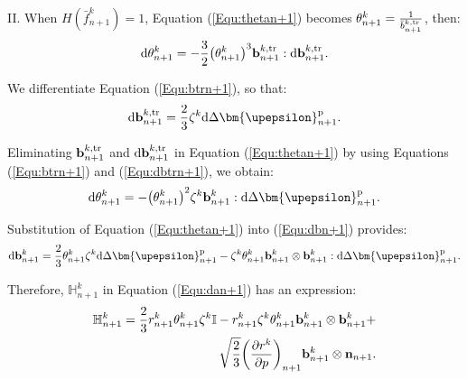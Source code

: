 II. When $H\left( {\bar f_{n + 1}^k} \right) = 1$, Equation (\ref{Equ:thetan+1}) becomes $\theta _{n + 1}^k = \frac{1}{{\bar b_{n + 1}^{k,{\rm{tr}}}}}$, then:
\begin{equation}
\label{Equ:thetan+1}
{\text{d}}\theta _{n + 1}^k =  - \frac{3}{2}{\left( {\theta _{n + 1}^k} \right)^3}{\bf{b}}_{n + 1}^{k,{\rm{tr}}}:{\text{d}}{\bf{b}}_{n + 1}^{k,{\rm{tr}}}.
\end{equation}

We differentiate Equation (\ref{Equ:btrn+1}), so that:
\begin{equation}
\label{Equ:dbtrn+1}
{\text{d}}{\bf{b}}_{n + 1}^{k,{\rm{tr}}} = \frac{2}{3}{\zeta ^k}{\text{d}}\Delta {\bm{\upepsilon }}_{n + 1}^{\rm{p}}.
\end{equation}

Eliminating ${\bf{b}}_{n + 1}^{k,{\rm{tr}}}$ and ${\text{d}}{\bf{b}}_{n + 1}^{k,{\rm{tr}}}$ in Equation (\ref{Equ:thetan+1}) by using Equations (\ref{Equ:btrn+1}) and (\ref{Equ:dbtrn+1}), we obtain:
\begin{equation}
\label{Equ:thetan+1}
{\text{d}}\theta _{n + 1}^k =  - {\left( {\theta _{n + 1}^k} \right)^2}{\zeta ^k}{\bf{b}}_{n + 1}^k:{\text{d}}\Delta {\bm{\upepsilon }}_{n + 1}^{\rm{p}}.
\end{equation}

Substitution of Equation (\ref{Equ:thetan+1}) into (\ref{Equ:dbn+1}) provides:
\begin{equation}
\label{Equ:dbn+12}
{\text{d}}{\bf{b}}_{n + 1}^k = \frac{2}{3}\theta _{n + 1}^k{\zeta ^k}{\text{d}}\Delta {\bm{\upepsilon }}_{n + 1}^{\rm{p}} - {\zeta ^k}\theta _{n + 1}^k{\bf{b}}_{n + 1}^k \otimes {\bf{b}}_{n + 1}^k:{\text{d}}\Delta {\bm{\upepsilon }}_{n + 1}^{\rm{p}}.
\end{equation}

Therefore, $\mathbb{H}_{n + 1}^k$ in Equation (\ref{Equ:dan+1}) has an expression:
\begin{equation}
\begin{aligned}
\mathbb{H}_{n + 1}^k = \frac{2}{3}r_{n + 1}^k\theta _{n + 1}^k{\zeta ^k}\mathbb{I} - r_{n + 1}^k{\zeta ^k}\theta _{n + 1}^k{\bf{b}}_{n + 1}^k \otimes {\bf{b}}_{n + 1}^k + \\
\sqrt {\frac{2}{3}} {\left( {\frac{{\partial {r^k}}}{{\partial p}}} \right)_{n + 1}}{\bf{b}}_{n + 1}^k \otimes {{\bf{n}}_{n + 1}}.
\end{aligned}
\end{equation}